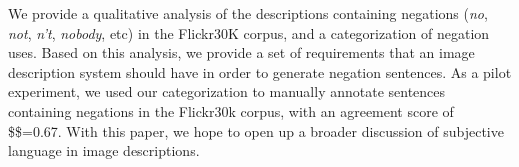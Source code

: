 We provide a qualitative analysis of the descriptions containing negations (\emph{no}, \emph{not}, \emph{n't}, \emph{nobody}, etc) in the Flickr30K corpus, and a categorization of negation uses. Based on this analysis, we provide a set of requirements that an image description system should have in order to generate negation sentences. As a pilot experiment, we used our categorization to manually annotate sentences containing negations in the Flickr30k corpus, with an agreement score of \$\kappa\$=0.67. With this paper, we hope to open up a broader discussion of subjective language in image descriptions.
